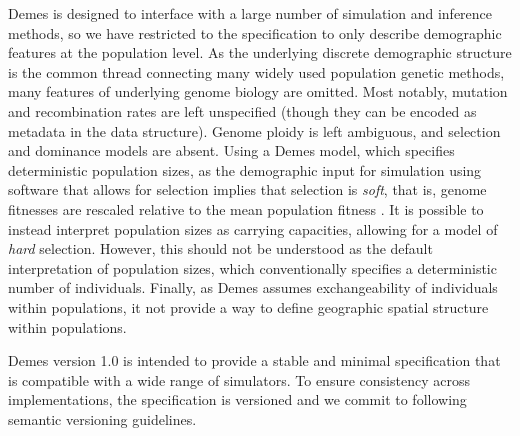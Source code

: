 \documentclass[11pt]{article}
\begin{document}
Demes is designed to interface with a large number of simulation and inference
methods, so we have restricted to the specification to only describe
demographic features at the population level. As the underlying discrete
demographic structure is the common thread connecting many widely used
population genetic methods, many features of underlying genome biology are
omitted. Most notably, mutation and recombination rates are left unspecified
(though they can be encoded as metadata in the data structure). Genome ploidy
is left ambiguous, and selection and dominance models are absent. Using a Demes
model, which specifies deterministic population sizes, as the demographic input
for simulation using software that allows for selection implies that selection
is \emph{soft}, that is, genome fitnesses are rescaled relative to the mean
population fitness \citep{christiansen1975hard}. It is possible to instead
interpret population sizes as carrying capacities, allowing for a model of
\emph{hard} selection. However, this should not be understood as the default
interpretation of population sizes, which conventionally specifies a
deterministic number of individuals. Finally, as Demes assumes exchangeability
of individuals within populations, it not provide a way to define geographic
spatial structure within populations.

Demes version 1.0 is intended to provide a stable and minimal specification
that is compatible with a wide range of simulators. To ensure consistency
across implementations, the specification is versioned and we commit to
following semantic versioning guidelines.
\end{document}
